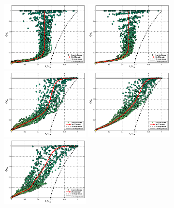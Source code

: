 \begin{figure}[!htbp]\centering
\includegraphics[width=0.4\textwidth]{Figures/mixing_cased1}
\includegraphics[width=0.4\textwidth]{Figures/mixing_casef1}\\
\includegraphics[width=0.4\textwidth]{Figures/mixing_cased2}
\includegraphics[width=0.4\textwidth]{Figures/mixing_casef2}\\
\includegraphics[width=0.4\textwidth]{Figures/mixing_cased3}

\end{figure}
